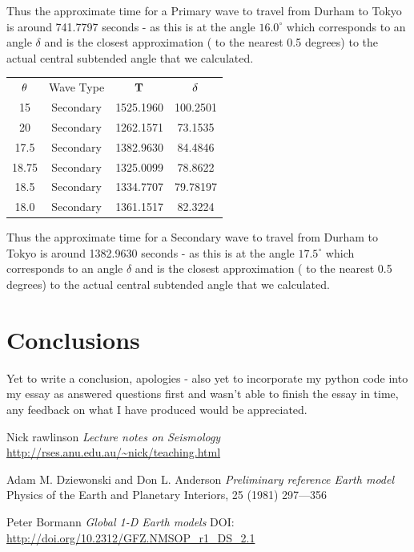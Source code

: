 \documentclass{mm2}
\begin{document}
\begin{answer}{5}
Thus the approximate time for a Primary wave to travel from Durham to Tokyo is around 741.7797 seconds - as this is at the angle $16.0^{\circ}$ which corresponds to an angle $\delta$ and is the closest approximation ( to the nearest 0.5 degrees) to the actual central subtended angle that we calculated.

\begin{center}
\begin{tabular}{ |c|c|c|c| } 
 \hline
 ${\bf \theta}$ & Wave Type & ${\bf T}$ & ${\bf \delta}$\\
 15 & Secondary & 1525.1960 & 100.2501 \\ 
 20 & Secondary & 1262.1571 & 73.1535 \\ 
 17.5 & Secondary & 1382.9630 & 84.4846 \\ 
 18.75 & Secondary & 1325.0099 & 78.8622 \\ 
 18.5 & Secondary & 1334.7707 & 79.78197 \\
 18.0 & Secondary & 1361.1517 & 82.3224\\ 
 \hline
\end{tabular}
\end{center}

Thus the approximate time for a Secondary wave to travel from Durham to Tokyo is around 1382.9630 seconds - as this is at the angle $17.5^{\circ}$ which corresponds to an angle $\delta$ and is the closest approximation ( to the nearest 0.5 degrees) to the actual central subtended angle that we calculated.

\end{answer}

\begin{answer}{6}
\end{answer}

\section{Conclusions}
Yet to write a conclusion, apologies - also yet to incorporate my python code into my essay as answered questions first and wasn't able to finish the essay in time, any feedback on what I have produced would be appreciated.

\begin{thebibliography}{99}

Nick rawlinson {\it Lecture notes on Seismology}
\url{http://rses.anu.edu.au/~nick/teaching.html}

Adam M. Dziewonski and Don L. Anderson
{\it Preliminary reference Earth model}
Physics of the Earth and Planetary Interiors, 25 (1981) 297—356

Peter Bormann
{\it Global 1-D Earth models}
DOI: \url{http://doi.org/10.2312/GFZ.NMSOP_r1_DS_2.1}


\end{thebibliography}
\end{document}
